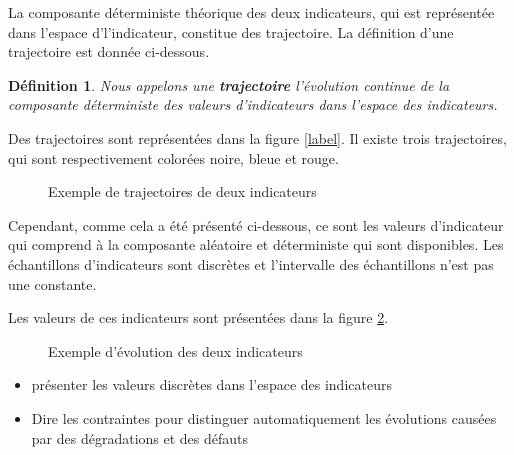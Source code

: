 \documentclass{article}
\newtheorem{definition}{Définition}
\begin{document}
La composante déterministe théorique  des deux indicateurs, qui est représentée dans l'espace d'l'indicateur, constitue des trajectoire. 
La définition d'une trajectoire est donnée ci-dessous. 
\begin{definition}
	Nous appelons une \textbf{trajectoire} l'évolution continue de la composante déterministe des valeurs d'indicateurs dans l'espace des indicateurs.
\end{definition}

Des trajectoires sont représentées dans la figure \ref{label}. 
Il existe trois trajectoires, qui sont respectivement colorées noire, bleue et rouge.  

\begin{figure}[H]
	\centering
	\caption{Exemple de trajectoires de deux indicateurs}
	\label{fig:trajectoiremu}
\end{figure}

Cependant, comme cela a été présenté ci-dessous, ce sont les valeurs d'indicateur qui comprend à la composante aléatoire et déterministe qui sont disponibles.
Les échantillons d'indicateurs sont discrètes et l'intervalle des échantillons n'est pas une constante. 

Les valeurs de ces indicateurs sont présentées dans la figure \ref{fig:exampletrajectoirer}.

\begin{figure}[H]
	\centering
	\caption{Exemple d'évolution des deux indicateurs}
	\label{fig:exampletrajectoirer}
\end{figure}

\begin{itemize}
    \item présenter les valeurs discrètes dans l'espace des indicateurs
    \item Dire les contraintes pour distinguer automatiquement les évolutions causées par des dégradations et des défauts
\end{itemize}


 
\end{document}
